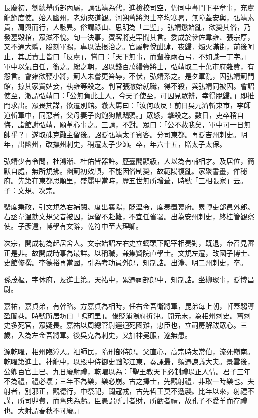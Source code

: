 \begin{pinyinscope}
 長慶初，劉總舉所部內屬，請弘靖為代，進檢校司空，仍同中書門下平章事，充盧龍節度使。始入幽州，老幼夾道觀。河朔舊將與士卒均寒暑，無障蓋安輿，弘靖素貴，肩輿而行，人駭異。俗謂祿山、思明為「二聖」，弘靖懲始亂，欲變其俗，乃發墓毀棺，眾滋不悅。旬一決事，賓客將吏罕聞其言。委成於參佐韋雍、張宗厚，又不通大體，朘刻軍賜，專以法拫治之。官屬輕侻酣肆，夜歸，燭火滿街，前後呵止，其詬責士皆曰「反虜」，嘗曰：「天下無事，而輩挽兩石弓，不如識一丁字。」軍中以氣自任，銜之。總之朝，詔以錢百萬緡賚將士，弘靖取二十萬市府雜費，有怨言。會雍欲鞭小將，薊人未嘗更笞辱，不伏，弘靖系之。是夕軍亂，囚弘靖薊門館，掠其家貲婢妾，執雍等殺之。判官張澈始就職，得不殺，與弘靖同被囚。會詔使至，澈謂弘靖曰：「公無負此土人，今天子使至，可因見眾辨，幸得脫歸。」即推門求出。眾畏其謀，欲遷別館。澈大罵曰：「汝何敢反！前日吳元濟斬東市，李師道斬軍中，同惡者，父母妻子肉飽狗鼠鴟鴉。」眾怒，擊殺之。數日，吏卒稍自悔，詣館謝弘靖，願革心事之。三請，不對。眾曰：「公不赦我矣，軍中可一日無帥乎？」遂取硃克融主留後。詔貶弘靖太子賓客。分司東都。再貶吉州刺史。明年，出幽州，改撫州刺史，稍遷太子少師。卒，年六十五，贈太子太保。



 弘靖少有令問，杜鴻漸、杜佑皆器許。歷臺閣顯級，人以為有輔相才。及居位，簡默自處，無所規拂。幽薊初效順，不能因俗制變，故範陽復亂。家聚書畫，侔秘府。先第在東都思順里，盛麗甲當時，歷五世無所增葺，時號「三相張家」云。子：文規、次宗。



 裴度秉政，引文規為右補闕。度出襄陽，貶溫令，度奏置幕府。累轉吏部員外郎。右丞韋溫劾文規父昔被囚，逗留不赴難，不宜任省署。出為安州刺史，終桂管觀察使。子彥遠，博學有文辭，乾符中至大理卿。



 次宗，開成初為起居舍人。文宗始詔左右史立螭頭下記宰相奏對，既退，帝召見審正是非。故開成時事為最詳。以稱職，兼集賢院直學士。文規左遷，改國子博士、史館修撰。李德裕再當國，引為考功員外郎，知制誥。出澧、明二州刺史，卒。



 孫茂樞，字休府，及進士第。天祐中，累遷祠部郎中，知制誥。坐柳璨事，貶博昌尉。



 嘉祐，嘉貞弟，有幹略。方嘉貞為相時，任右金吾衛將軍，昆弟每上朝，軒蓋騶導盈閭巷。時號所居坊曰「鳴珂里」。後貶浦陽府折沖。開元末，為相州刺史。舊刺史多死官，眾疑畏。嘉祐以周總管尉遲迥死國難，忠臣也，立祠房解祓眾心。三歲，入為左金吾將軍。後吳克為刺史，又加神冕服，遂無患。



 源乾曜，相州臨漳人。祖師民，隋刑部侍郎。父直心，高宗時太常伯，流死嶺南。乾曜第進士。神龍中，以殿中侍御史黜陟江東，奏課最，頻遷諫議大夫。景雲後，公卿百官上巳、九日廢射禮，乾曜以為：「聖王教天下必制禮以正人情。君子三年不為禮，禮必壞；三年不為樂，樂必崩。古之擇士，先觀射禮，非取一時樂也。夫射者，別邪正，觀德行，中祭祀，闢寇戎，古先哲王莫不遞襲。比年以來，射禮不講，所司丱費，而舊典為虧。臣愚謂所計者財，所虧者禮，故孔子不愛羊而存禮也。大射謂春秋不可廢。」




\end{pinyinscope}
